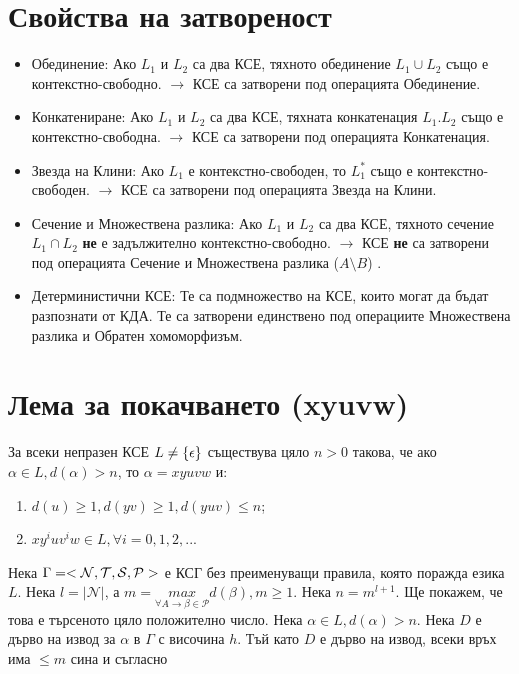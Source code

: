 \documentclass[11pt]{article}
\begin{document}
\section{Свойства на затвореност}
\begin{itemize}
	\item Обединение: Ако $L_{1}$ и $L_{2}$ са два КСЕ, тяхното обединение $L_{1} \cup L_{2}$ също е контекстно-свободно. $\rightarrow$ КСЕ са затворени под операцията Обединение. 
	\item Конкатениране:  Ако $L_{1}$ и $L_{2}$ са два КСЕ, тяхната конкатенация $L_{1}.L_{2}$ също е контекстно-свободна. $\rightarrow$ КСЕ са затворени под операцията Конкатенация. 
	\item Звезда на Клини: Ако $L_{1}$ е контекстно-свободен, то $L_{1}^{*}$ също е контекстно-свободен. $\rightarrow$ КСЕ са затворени под операцията Звезда на Клини. 
	\item Сечение и Множествена разлика: Ако $L_{1}$ и $L_{2}$ са два КСЕ, тяхното сечение $L_{1} \cap L_{2}$ \textbf{не} е задължително контекстно-свободно. $\rightarrow$ КСЕ \textbf{не} са затворени под операцията Сечение и Множествена разлика ($A \setminus B$) . 
	\item Детерминистични КСЕ: Те са подмножество на КСЕ, които могат да бъдат разпознати от КДА. Те са затворени единствено под операциите Множествена разлика и Обратен хомоморфизъм.  
\end{itemize}

\section{Лема за покачването (xyuvw)}
\lemma {} За всеки непразен КСЕ $L \neq \{\epsilon\}$ съществува цяло $n > 0$ такова, че ако $\alpha \in L, d(\alpha) > n$, то $\alpha = xyuvw$ и:

\enumNum
\begin{enumerate}
	\item $d(u) \geq 1, d(yv) \geq 1, d(yuv) \leq n$;
	\item $xy^{i}uv^{i}w \in L, \forall i = 0, 1, 2, ...$
\end{enumerate}
\proof Нека $\Gamma = <\mathcal{N}, \mathcal{T}, \mathcal{S}, \mathcal{P}>$ е КСГ без преименуващи правила, която поражда езика $L$. Нека $l = |\mathcal{N}|$, а $m = \underset{\forall A \to \beta \in \mathcal{P}}{max} d(\beta), m \geq 1$. Нека $n = m^{l + 1}$. Ще покажем, че това е търсеното цяло положително число. Нека $\alpha \in L, d(\alpha) > n$. Нека $D$ е дърво на извод за $\alpha$ в $\Gamma$ с височина $h$. Тъй като $D$ е дърво на извод, всеки връх има $\leq m$ сина и съгласно \\
 
\end{document}
